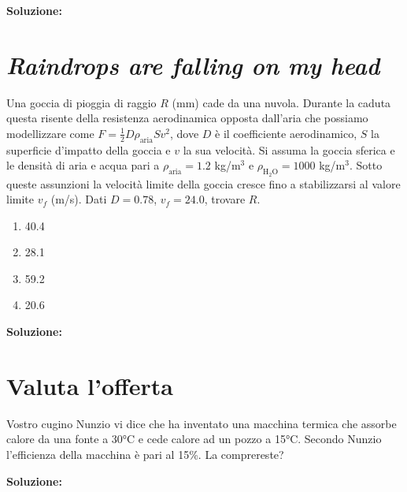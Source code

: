 \noindent \textbf{Soluzione:}


\section{\textit{Raindrops are falling on my head}}
Una goccia di pioggia di raggio $R$ (mm)
cade da una nuvola. Durante la caduta
questa risente della resistenza aerodinamica
opposta dall'aria che possiamo modellizzare
come $F = \frac12 D \rho_\text{aria} S v^2$,
dove $D$ è il coefficiente aerodinamico,
$S$ la superficie d'impatto della goccia e
$v$ la sua velocità. Si assuma la goccia
sferica e le densità di aria e acqua pari a
$\rho_\text{aria} = 1.2$ kg/m$^3$ e
$\rho_\text{H$_2$O} = 1000$ kg/m$^3$. Sotto
queste assunzioni la velocità limite della
goccia cresce fino a stabilizzarsi al
valore limite $v_f$ (m/s). Dati $D = 0.78$,
$v_f = 24.0$, trovare $R$.

\begin{enumerate}
    \item 40.4
    \item 28.1
    \item 59.2
    \item 20.6
\end{enumerate}

\noindent \textbf{Soluzione:}

\section{Valuta l'offerta}
Vostro cugino Nunzio vi dice che ha inventato una macchina termica che assorbe
calore da una fonte a 30°C e cede calore ad un pozzo a 15°C. Secondo Nunzio
l'efficienza della macchina è pari al 15\%. La comprereste?

\noindent \textbf{Soluzione:}